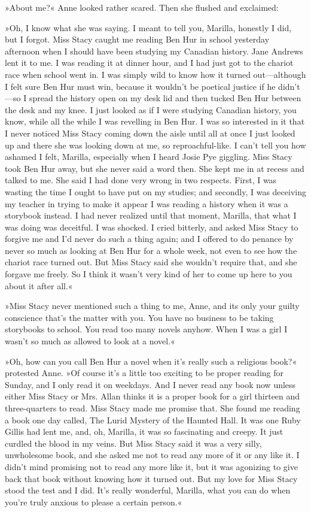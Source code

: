 »About me?« Anne looked rather scared. Then she flushed and exclaimed:

»Oh, I know what she was saying. I meant to tell you, Marilla, honestly I did, but I forgot. Miss Stacy caught me reading Ben Hur in school yesterday afternoon when I should have been studying my Canadian history. Jane Andrews lent it to me. I was reading it at dinner hour, and I had just got to the chariot race when school went in. I was simply wild to know how it turned out—although I felt sure Ben Hur must win, because it wouldn’t be poetical justice if he didn’t—so I spread the history open on my desk lid and then tucked Ben Hur between the desk and my knee. I just looked as if I were studying Canadian history, you know, while all the while I was revelling in Ben Hur. I was so interested in it that I never noticed Miss Stacy coming down the aisle until all at once I just looked up and there she was looking down at me, so reproachful-like. I can’t tell you how ashamed I felt, Marilla, especially when I heard Josie Pye giggling. Miss Stacy took Ben Hur away, but she never said a word then. She kept me in at recess and talked to me. She said I had done very wrong in two respects. First, I was wasting the time I ought to have put on my studies; and secondly, I was deceiving my teacher in trying to make it appear I was reading a history when it was a storybook instead. I had never realized until that moment, Marilla, that what I was doing was deceitful. I was shocked. I cried bitterly, and asked Miss Stacy to forgive me and I’d never do such a thing again; and I offered to do penance by never so much as looking at Ben Hur for a whole week, not even to see how the chariot race turned out. But Miss Stacy said she wouldn’t require that, and she forgave me freely. So I think it wasn’t very kind of her to come up here to you about it after all.«

»Miss Stacy never mentioned such a thing to me, Anne, and its only your guilty conscience that’s the matter with you. You have no business to be taking storybooks to school. You read too many novels anyhow. When I was a girl I wasn’t so much as allowed to look at a novel.«

»Oh, how can you call Ben Hur a novel when it’s really such a religious book?« protested Anne. »Of course it’s a little too exciting to be proper reading for Sunday, and I only read it on weekdays. And I never read any book now unless either Miss Stacy or Mrs. Allan thinks it is a proper book for a girl thirteen and three-quarters to read. Miss Stacy made me promise that. She found me reading a book one day called, The Lurid Mystery of the Haunted Hall. It was one Ruby Gillis had lent me, and, oh, Marilla, it was so fascinating and creepy. It just curdled the blood in my veins. But Miss Stacy said it was a very silly, unwholesome book, and she asked me not to read any more of it or any like it. I didn’t mind promising not to read any more like it, but it was agonizing to give back that book without knowing how it turned out. But my love for Miss Stacy stood the test and I did. It’s really wonderful, Marilla, what you can do when you’re truly anxious to please a certain person.«

